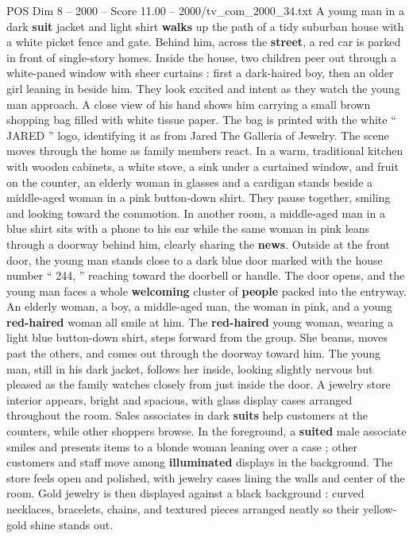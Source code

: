 \begin{textsample}{POS Dim 8 – 2000 – Score 11.00 – 2000/tv\_com\_2000\_34.txt}  \label{ex:f8_pos_004}
A young man in a dark \textbf{suit} jacket and light shirt \textbf{walks} up the path of a tidy suburban house with a white picket fence and gate.
Behind him, across the \textbf{street}, a red car is parked in front of single-story homes.
Inside the house, two children peer out through a white-paned window with sheer curtains : first a dark-haired boy, then an older girl leaning in beside him.
They look excited and intent as they watch the young man approach.
A close view of his hand shows him carrying a small brown shopping bag filled with white tissue paper.
The bag is printed with the white “ JARED ” logo, identifying it as from Jared The Galleria of Jewelry.
The scene moves through the home as family members react.
In a warm, traditional kitchen with wooden cabinets, a white stove, a sink under a curtained window, and fruit on the counter, an elderly woman in glasses and a cardigan stands beside a middle-aged woman in a pink button-down shirt.
They pause together, smiling and looking toward the commotion.
In another room, a middle-aged man in a blue shirt sits with a phone to his ear while the same woman in pink leans through a doorway behind him, clearly sharing the \textbf{news}.
Outside at the front door, the young man stands close to a dark blue door marked with the house number “ 244, ” reaching toward the doorbell or handle.
The door opens, and the young man faces a whole \textbf{welcoming} cluster of \textbf{people} packed into the entryway.
An elderly woman, a boy, a middle-aged man, the woman in pink, and a young \textbf{red-haired} woman all smile at him.
The \textbf{red-haired} young woman, wearing a light blue button-down shirt, steps forward from the group.
She beams, moves past the others, and comes out through the doorway toward him.
The young man, still in his dark jacket, follows her inside, looking slightly nervous but pleased as the family watches closely from just inside the door.
A jewelry store interior appears, bright and spacious, with glass display cases arranged throughout the room.
Sales associates in dark \textbf{suits} help customers at the counters, while other shoppers browse.
In the foreground, a \textbf{suited} male associate smiles and presents items to a blonde woman leaning over a case ; other customers and staff move among \textbf{illuminated} displays in the background.
The store feels open and polished, with jewelry cases lining the walls and center of the room.
Gold jewelry is then displayed against a black background : curved necklaces, bracelets, chains, and textured pieces arranged neatly so their yellow-gold shine stands out.

\end{textsample}
